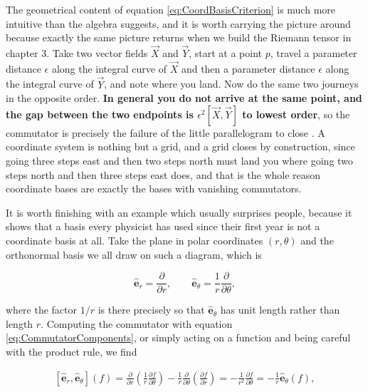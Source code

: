         The geometrical content of equation \ref{eq:CoordBasisCriterion} is much more intuitive than the algebra suggests, and it is worth carrying the picture around because exactly the same picture returns when we build the Riemann tensor in chapter 3. Take two vector fields $\Vec{X}$ and $\Vec{Y}$, start at a point $p$, travel a parameter distance $\epsilon$ along the integral curve of $\Vec{X}$ and then a parameter distance $\epsilon$ along the integral curve of $\Vec{Y}$, and note where you land. Now do the same two journeys in the opposite order. \textbf{In general you do not arrive at the same point, and the gap between the two endpoints is $\epsilon^2\left[\Vec{X},\Vec{Y}\right]$ to lowest order}, so the commutator is precisely the failure of the little parallelogram to close \citep{mtw1973}. A coordinate system is nothing but a grid, and a grid closes by construction, since going three steps east and then two steps north must land you where going two steps north and then three steps east does, and that is the whole reason coordinate bases are exactly the bases with vanishing commutators.

        It is worth finishing with an example which usually surprises people, because it shows that a basis every physicist has used since their first year is not a coordinate basis at all. Take the plane in polar coordinates $(r,\theta)$ and the orthonormal basis we all draw on such a diagram, which is

        \begin{equation}
            \hat{\mathbf{e}}_r = \frac{\partial}{\partial r},\qquad \hat{\mathbf{e}}_{\theta} = \frac{1}{r}\frac{\partial}{\partial \theta},
        \end{equation}

        where the factor $1/r$ is there precisely so that $\hat{\mathbf{e}}_{\theta}$ has unit length rather than length $r$. Computing the commutator with equation \ref{eq:CommutatorComponents}, or simply acting on a function and being careful with the product rule, we find

        \begin{align*}
            \left[\hat{\mathbf{e}}_r,\hat{\mathbf{e}}_{\theta}\right](f) = \frac{\partial}{\partial r}\left(\frac{1}{r}\frac{\partial f}{\partial \theta}\right) - \frac{1}{r}\frac{\partial}{\partial \theta}\left(\frac{\partial f}{\partial r}\right) = -\frac{1}{r^2}\frac{\partial f}{\partial \theta} = -\frac{1}{r}\hat{\mathbf{e}}_{\theta}(f),
        \end{align*}

